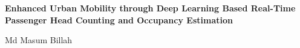 \documentclass[12pt,a4paper]{report}
\begin{document}
\setcounter{page}{1}

\begin{center}
    {\fontsize{18}{22}\selectfont\bfseries
    Enhanced Urban Mobility through Deep Learning Based Real-Time Passenger Head Counting and Occupancy Estimation\par}

    \vspace{6pt}

    {\fontsize{12}{15}\selectfont
    Md Masum Billah\par}

    \vspace{18pt}
\end{center}

{
    \let\clearpage\relax
    
}

\setcounter{page}{1}

	
	
	
	
	


\begingroup
\let\clearpage\relax
\renewcommand{\bibname}{References}


\endgroup
\end{document}
